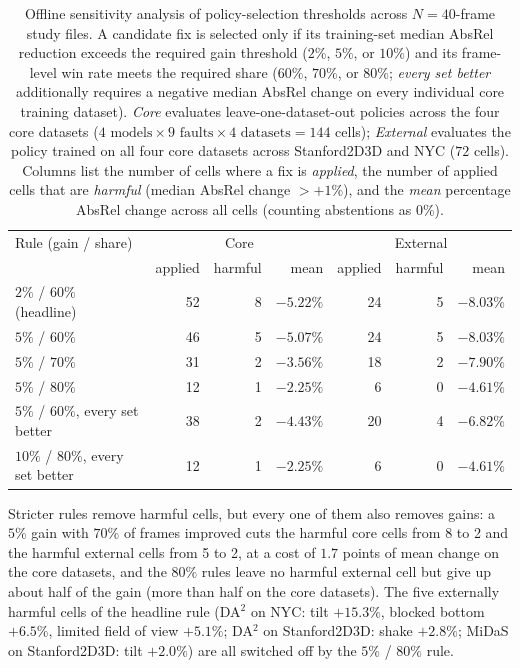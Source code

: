 \documentclass{article}
\newcommand{\absrel}{AbsRel}
\begin{document}
\begin{table}[ht]\centering\small
\caption{Offline sensitivity analysis of policy-selection thresholds across $N=40$-frame study files. A candidate fix is selected only if its training-set median \absrel{} reduction exceeds the required gain threshold ($2\%$, $5\%$, or $10\%$) and its frame-level win rate meets the required share ($60\%$, $70\%$, or $80\%$; \emph{every set better} additionally requires a negative median \absrel{} change on every individual core training dataset). \emph{Core} evaluates leave-one-dataset-out policies across the four core datasets ($4\text{ models}\times9\text{ faults}\times4\text{ datasets}=144$ cells); \emph{External} evaluates the policy trained on all four core datasets across Stanford2D3D and NYC ($72$ cells). Columns list the number of cells where a fix is \emph{applied}, the number of applied cells that are \emph{harmful} (median \absrel{} change $>+1\%$), and the \emph{mean} percentage \absrel{} change across all cells (counting abstentions as $0\%$).}
\begin{tabular}{lrrrrrr}\toprule
Rule (gain / share) & \multicolumn{3}{c}{Core} & \multicolumn{3}{c}{External}\\
 & applied & harmful & mean & applied & harmful & mean\\\midrule
$2\%$ / $60\%$ (headline) & 52 & 8 & $-5.22\%$ & 24 & 5 & $-8.03\%$\\
$5\%$ / $60\%$ & 46 & 5 & $-5.07\%$ & 24 & 5 & $-8.03\%$\\
$5\%$ / $70\%$ & 31 & 2 & $-3.56\%$ & 18 & 2 & $-7.90\%$\\
$5\%$ / $80\%$ & 12 & 1 & $-2.25\%$ & 6 & 0 & $-4.61\%$\\
$5\%$ / $60\%$, every set better & 38 & 2 & $-4.43\%$ & 20 & 4 & $-6.82\%$\\
$10\%$ / $80\%$, every set better & 12 & 1 & $-2.25\%$ & 6 & 0 & $-4.61\%$\\
\bottomrule\end{tabular}
\end{table}
Stricter rules remove harmful cells, but every one of them also removes gains: a $5\%$ gain with $70\%$ of frames improved cuts the harmful core cells from 8 to 2 and the harmful external cells from 5 to 2, at a cost of $1.7$ points of mean change on the core datasets, and the $80\%$ rules leave no harmful external cell but give up about half of the gain (more than half on the core datasets). The five externally harmful cells of the headline rule (DA$^2$ on NYC: tilt $+15.3\%$, blocked bottom $+6.5\%$, limited field of view $+5.1\%$; DA$^2$ on Stanford2D3D: shake $+2.8\%$; MiDaS on Stanford2D3D: tilt $+2.0\%$) are all switched off by the $5\%$ / $80\%$ rule.
\end{document}
